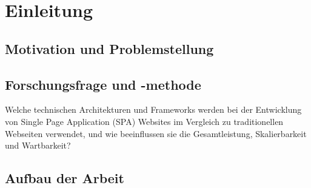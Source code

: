 

\section{Einleitung}

\subsection{Motivation und Problemstellung}
\subsection{Forschungsfrage und -methode}
Welche technischen Architekturen und Frameworks werden bei der Entwicklung von Single Page Application (SPA) Websites im Vergleich zu traditionellen Webseiten verwendet, und wie beeinflussen sie die Gesamtleistung, Skalierbarkeit und Wartbarkeit?

\subsection{Aufbau der Arbeit}
